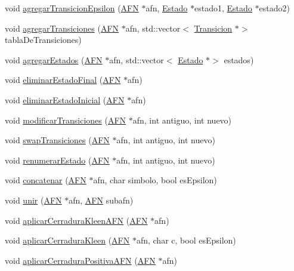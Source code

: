 \begin{DoxyCompactItemize}
\item 
void \hyperlink{class_a_f_n_a67852dd0b85a91d9114df429592850ac}{agregar\+Transicion\+Epsilon} (\hyperlink{class_a_f_n}{A\+FN} $\ast$afn, \hyperlink{class_estado}{Estado} $\ast$estado1, \hyperlink{class_estado}{Estado} $\ast$estado2)
\item 
void \hyperlink{class_a_f_n_aec249b192efe9df63c9e6df4ef5b96af}{agregar\+Transiciones} (\hyperlink{class_a_f_n}{A\+FN} $\ast$afn, std\+::vector$<$ \hyperlink{class_transicion}{Transicion} $\ast$$>$ tabla\+De\+Transiciones)
\item 
void \hyperlink{class_a_f_n_a565f890649af177b45ad4111ad0d14ec}{agregar\+Estados} (\hyperlink{class_a_f_n}{A\+FN} $\ast$afn, std\+::vector$<$ \hyperlink{class_estado}{Estado} $\ast$$>$ estados)
\item 
void \hyperlink{class_a_f_n_a9585f1a106bc12c61682025cf3bce1f7}{eliminar\+Estado\+Final} (\hyperlink{class_a_f_n}{A\+FN} $\ast$afn)
\item 
void \hyperlink{class_a_f_n_a13782c7d882786a73b35e289d75c9c61}{eliminar\+Estado\+Inicial} (\hyperlink{class_a_f_n}{A\+FN} $\ast$afn)
\item 
void \hyperlink{class_a_f_n_a88e43b61c88b0fa50babdc343b432166}{modificar\+Transiciones} (\hyperlink{class_a_f_n}{A\+FN} $\ast$afn, int antiguo, int nuevo)
\item 
void \hyperlink{class_a_f_n_af2804ad2f92e4a909fd9afffb64a47c4}{swap\+Transiciones} (\hyperlink{class_a_f_n}{A\+FN} $\ast$afn, int antiguo, int nuevo)
\item 
void \hyperlink{class_a_f_n_aae3289b516c0cbf17759c279f1544e09}{renumerar\+Estado} (\hyperlink{class_a_f_n}{A\+FN} $\ast$afn, int antiguo, int nuevo)
\item 
void \hyperlink{class_a_f_n_a5247562556a165a9eae8524143ace7db}{concatenar} (\hyperlink{class_a_f_n}{A\+FN} $\ast$afn, char simbolo, bool es\+Epsilon)
\item 
void \hyperlink{class_a_f_n_ac4100292cd0b27797b1e4ee50266a079}{unir} (\hyperlink{class_a_f_n}{A\+FN} $\ast$afn, \hyperlink{class_a_f_n}{A\+FN} subafn)
\item 
void \hyperlink{class_a_f_n_a778ea064155d383463cabd37ac301a14}{aplicar\+Cerradura\+Kleen\+A\+FN} (\hyperlink{class_a_f_n}{A\+FN} $\ast$afn)
\item 
void \hyperlink{class_a_f_n_aed4763d61a7630ff6c4810be588c6089}{aplicar\+Cerradura\+Kleen} (\hyperlink{class_a_f_n}{A\+FN} $\ast$afn, char c, bool es\+Epsilon)
\item 
void \hyperlink{class_a_f_n_a951fb01c6437c633311aa15b1246a290}{aplicar\+Cerradura\+Positiva\+A\+FN} (\hyperlink{class_a_f_n}{A\+FN} $\ast$afn)

\end{DoxyCompactItemize}
